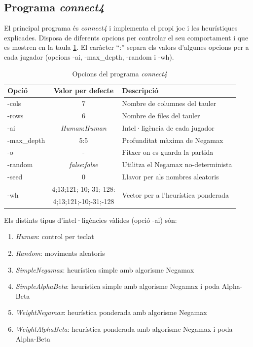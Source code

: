 \documentclass[12pt,a4paper]{article}
\begin{document}
\subsection{Programa \emph{connect4}}
El principal programa és \emph{connect4} i implementa el propi joc i les heurístiques explicades. Disposa de diferents opcions per controlar el seu comportament i que es mostren en la taula \ref{tab:connect4_opts}. El caràcter ``:'' separa els valors d'algunes opcions per a cada jugador (opcions -ai, -max\_depth, -random i -wh). \\

\begin{table}[h]
\centering
\begin{tabular}{|l|c|l|}
\hline 
Opció & Valor per defecte & Descripció\\
\hline 
-cols & 7 & Nombre de columnes del tauler\\
-rows & 6 & Nombre de files del tauler\\
-ai & \emph{Human}:\emph{Human} & Intel·ligència de cada jugador \\
-max\_depth & 5:5 & Profunditat màxima de Negamax\\
-o & - & Fitxer on es guarda la partida\\
-random & \emph{false}:\emph{false} & Utilitza el Negamax no-determinista\\
-seed & 0 & Llavor per als nombres aleatoris\\
\multirow{2}{*}{-wh} & 4;13;121;-10;-31;-128: & \multirow{2}{*}{Vector per a l'heurística ponderada}\\
& 4;13;121;-10;-31;-128 & \\
\hline
\end{tabular}
\caption{Opcions del programa \emph{connect4}}
\label{tab:connect4_opts}
\end{table}

Els distints tipus d'intel·ligències vàlides (opció -ai) són:
\begin{enumerate}
\item \emph{Human}: control per teclat
\item \emph{Random}: moviments aleatoris
\item \emph{SimpleNegamax}: heurística simple amb algorisme Negamax
\item \emph{SimpleAlphaBeta}: heurística simple amb algorisme Negamax i poda Alpha-Beta
\item \emph{WeightNegamax}: heurística ponderada amb algorisme Negamax
\item \emph{WeightAlphaBeta}: heurística ponderada amb algorisme Negamax i poda Alpha-Beta
\end{enumerate}
\end{document}

